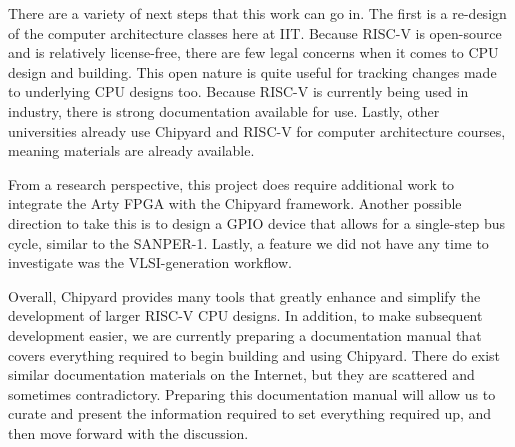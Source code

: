 \documentclass[10pt,letterpaper,final,twoside,notitlepage]{article}
\begin{document}
There are a variety of next steps that this work can go in.
The first is a re-design of the computer architecture classes here at IIT.\@
Because RISC-V is open-source and is relatively license-free, there are few legal concerns when it comes to CPU design and building.
This open nature is quite useful for tracking changes made to underlying CPU designs too.
Because RISC-V is currently being used in industry, there is strong documentation available for use.
Lastly, other universities already use Chipyard and RISC-V for computer architecture courses, meaning materials are already available.

From a research perspective, this project does require additional work to integrate the Arty FPGA with the Chipyard framework.
Another possible direction to take this is to design a GPIO device that allows for a single-step bus cycle, similar to the SANPER-1.
Lastly, a feature we did not have any time to investigate was the VLSI-generation workflow.

Overall, Chipyard provides many tools that greatly enhance and simplify the development of larger RISC-V CPU designs.
In addition, to make subsequent development easier, we are currently preparing a documentation manual that covers everything required to begin building and using Chipyard.
There do exist similar documentation materials on the Internet, but they are scattered and sometimes contradictory.
Preparing this documentation manual will allow us to curate and present the information required to set everything required up, and then move forward with the discussion.

\printbibliography[heading=bibintoc]{}
\end{document}
